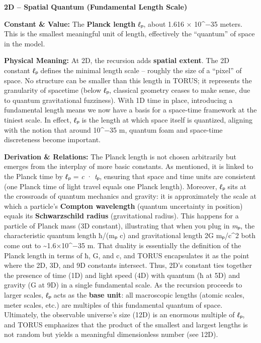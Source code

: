 \textbf{2D -- Spatial Quantum (Fundamental Length Scale)}

\textbf{Constant \& Value:} The \textbf{Planck length} \emph{ℓ}ₚ, about
1.616 × 10\^{}−35 meters​. This is the smallest meaningful unit of
length, effectively the ``quantum'' of space in the model.

\textbf{Physical Meaning:} At 2D, the recursion adds \textbf{spatial
extent}. The 2D constant \emph{ℓ}ₚ defines the minimal length scale --
roughly the size of a ``pixel'' of space. No structure can be smaller
than this length in TORUS; it represents the granularity of spacetime
(below \emph{ℓ}ₚ, classical geometry ceases to make sense, due to
quantum gravitational fuzziness). With 1D time in place, introducing a
fundamental length means we now have a basis for a space-time framework
at the tiniest scale. In effect, \emph{ℓ}ₚ is the length at which space
itself is quantized, aligning with the notion that around 10\^{}−35 m,
quantum foam and space-time discreteness become important.

\textbf{Derivation \& Relations:} The Planck length is not chosen
arbitrarily but emerges from the interplay of more basic constants. As
mentioned, it is linked to the Planck time by \emph{ℓ}ₚ = \emph{c} ·
\emph{t}ₚ, ensuring that space and time units are consistent (one Planck
time of light travel equals one Planck length). Moreover, \emph{ℓ}ₚ sits
at the crossroads of quantum mechanics and gravity: it is approximately
the scale at which a particle's \textbf{Compton wavelength} (quantum
uncertainty in position) equals its \textbf{Schwarzschild radius}
(gravitational radius). This happens for a particle of Planck mass (3D
constant), illustrating that when you plug in \emph{m}ₚ, the
characteristic quantum length ħ/(mₚ c) and gravitational length 2G
mₚ/c\^{}2 both come out to \textasciitilde{}1.6×10\^{}−35 m​. That
duality is essentially the definition of the Planck length in terms of
ħ, G, and c, and TORUS encapsulates it as the point where the 2D, 3D,
and 9D constants intersect. Thus, 2D's constant ties together the
presence of time (1D) and light speed (4D) with quantum (ħ at 5D) and
gravity (G at 9D) in a single fundamental scale​. As the recursion
proceeds to larger scales, \emph{ℓ}ₚ acts as the \textbf{base unit}: all
macroscopic lengths (atomic scales, meter scales, etc.) are multiples of
this fundamental quantum of space. Ultimately, the observable universe's
size (12D) is an enormous multiple of \emph{ℓ}ₚ, and TORUS emphasizes
that the product of the smallest and largest lengths is not random but
yields a meaningful dimensionless number (see 12D)​.

